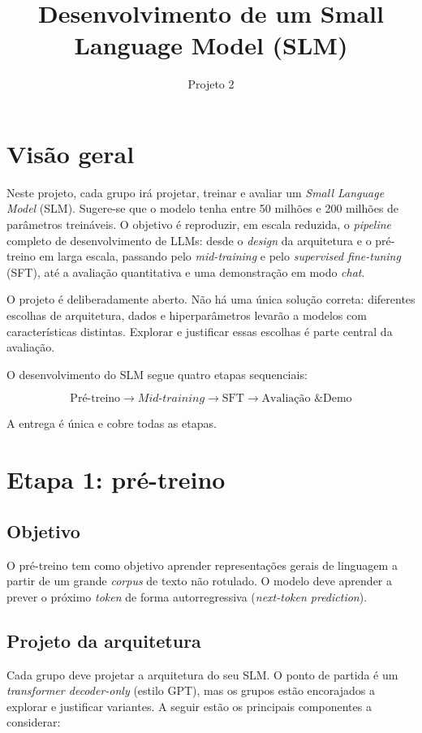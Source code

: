 \documentclass{dlproblemset}
\title{Desenvolvimento de um Small Language Model (SLM)}
\subtitle{Projeto 2}
\begin{document}
\section*{Visão geral}

Neste projeto, cada grupo irá projetar, treinar e avaliar um \textit{Small Language Model} (SLM). Sugere-se que o modelo tenha entre 50 milhões e 200 milhões de parâmetros treináveis. O objetivo é reproduzir, em escala reduzida, o \textit{pipeline} completo de desenvolvimento de LLMs: desde o \textit{design} da arquitetura e o pré-treino em larga escala, passando pelo \textit{mid-training} e pelo \textit{supervised fine-tuning} (SFT), até a avaliação quantitativa e uma demonstração em modo \textit{chat}.

O projeto é deliberadamente aberto. Não há uma única solução correta: diferentes escolhas de arquitetura, dados e hiperparâmetros levarão a modelos com características distintas. Explorar e justificar essas escolhas é parte central da avaliação.

O desenvolvimento do SLM segue quatro etapas sequenciais:

\[
    \text{Pré-treino} \longrightarrow \textit{Mid-training} \longrightarrow \text{SFT} \longrightarrow \text{Avaliação \& Demo}
\]

A entrega é única e cobre todas as etapas.

\section*{Etapa 1: pré-treino}

\subsection*{Objetivo}

O pré-treino tem como objetivo aprender representações gerais de linguagem a partir de um grande \textit{corpus} de texto não rotulado. O modelo deve aprender a prever o próximo \textit{token} de forma autorregressiva (\textit{next-token prediction}).

\subsection*{Projeto da arquitetura}

Cada grupo deve projetar a arquitetura do seu SLM. O ponto de partida é um \textit{transformer decoder-only} (estilo GPT), mas os grupos estão encorajados a explorar e justificar variantes. A seguir estão os principais componentes a considerar:
\end{document}
